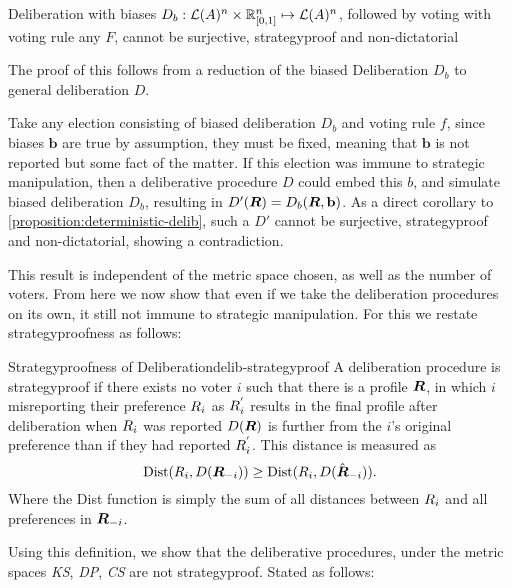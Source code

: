 \begin{corollary}
	Deliberation with biases ${D}_b: \mathcal{L}(A) ^ n \times \mathbb{R}_{[0,1]}^n \mapsto \mathcal{L}(A)^n$, followed by voting with voting rule any $F$, cannot be surjective, strategyproof and non-dictatorial

	\label{corollary:biased-delib}
\end{corollary}

The proof of this follows from a reduction of the biased Deliberation $D_b$ to general deliberation $D$.

\begin{proofc}{}
	Take any election consisting of biased deliberation $D_b$ and voting rule $f$, since biases $\mathbf{b}$ are true by assumption, they must be fixed, meaning that $\mathbf{b}$ is not reported but some fact of the matter. If this election was immune to strategic manipulation, then a deliberative procedure $D$ could embed this $b$, and simulate biased deliberation $D_b$, resulting in $D'(\boldsymbol{R}) = D_b(\boldsymbol{R}, \mathbf{b})$. As a direct corollary to \cref{proposition:deterministic-delib}, such a $D'$ cannot be surjective, strategyproof and non-dictatorial, showing a contradiction.
\end{proofc}

This result is independent of the metric space chosen, as well as the number of voters. From here we now show that even if we take the deliberation procedures on its own, it still not immune to strategic manipulation. For this we restate strategyproofness as follows:

\begin{definition}{Strategyproofness of Deliberation}{delib-strategyproof}
	A deliberation procedure is strategyproof if there exists no voter $i$ such that there is a profile $\boldsymbol{R}$, in which $i$ misreporting their preference $R_{i}$ as $R_{i}^{'}$ results in the final profile after deliberation  when $R_{i}$ was reported $D(\boldsymbol{R})$ is further from the $i$'s original preference than if they had reported $R_{i}^{'}$. This distance is measured as
	\[\operatorname{Dist}(R_{i}, D(\boldsymbol{R}_{-i})) \geq \operatorname{Dist}(R_{i}, D(\hat{\boldsymbol{R}}_{-i})).\]
	Where the Dist function is simply the sum of all distances between $R_i$ and all preferences in $\boldsymbol{R}_{-i}$.
\end{definition}

Using this definition, we show that the deliberative procedures, under the metric spaces \textit{KS}, \textit{ DP}, \textit{ CS} are not strategyproof. Stated as follows:

